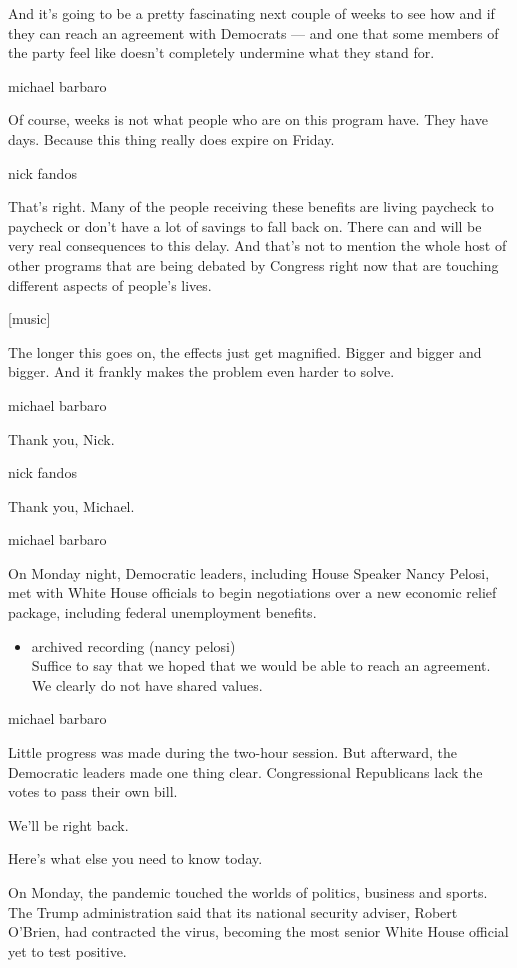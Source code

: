 And it's going to be a pretty fascinating next couple of weeks to see
how and if they can reach an agreement with Democrats --- and one that
some members of the party feel like doesn't completely undermine what
they stand for.

michael barbaro

Of course, weeks is not what people who are on this program have. They
have days. Because this thing really does expire on Friday.

nick fandos

That's right. Many of the people receiving these benefits are living
paycheck to paycheck or don't have a lot of savings to fall back on.
There can and will be very real consequences to this delay. And that's
not to mention the whole host of other programs that are being debated
by Congress right now that are touching different aspects of people's
lives.

{[}music{]}

The longer this goes on, the effects just get magnified. Bigger and
bigger and bigger. And it frankly makes the problem even harder to
solve.

michael barbaro

Thank you, Nick.

nick fandos

Thank you, Michael.

michael barbaro

On Monday night, Democratic leaders, including House Speaker Nancy
Pelosi, met with White House officials to begin negotiations over a new
economic relief package, including federal unemployment benefits.

\begin{itemize}
\tightlist
\item
  archived recording (nancy pelosi)\\
  Suffice to say that we hoped that we would be able to reach an
  agreement. We clearly do not have shared values.
\end{itemize}

michael barbaro

Little progress was made during the two-hour session. But afterward, the
Democratic leaders made one thing clear. Congressional Republicans lack
the votes to pass their own bill.

We'll be right back.

Here's what else you need to know today.

On Monday, the pandemic touched the worlds of politics, business and
sports. The Trump administration said that its national security
adviser, Robert O'Brien, had contracted the virus, becoming the most
senior White House official yet to test positive.

